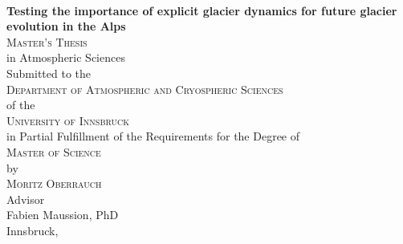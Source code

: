 \begin{titlepage}
\begin{center}

~\\[15mm]
{\Huge  {\bf Testing the importance of explicit glacier dynamics for
future glacier evolution in the Alps}}\\[5mm]




{\Large \textsc{Master's Thesis}} \\[15mm]


{\large in Atmospheric Sciences} \\[15mm]


{\large Submitted to the} \\[2mm]
{\Large \textsc{Department of Atmospheric and Cryospheric Sciences}} \\[2mm]
{\large of the} \\[2mm]
{\Large \textsc{University of Innsbruck}} \\[15mm]


{\large in Partial Fulfillment of the Requirements for the Degree of} \\[2mm]
{\Large \textsc{Master of Science}} \\[15mm]


{\large by} \\[2mm]
{\Large \textsc{Moritz Oberrauch}} \\[15mm]


{\large Advisor} \\[2mm]
{\large Fabien Maussion, PhD} \\[15mm]


{\large Innsbruck, \monthyeardate{\today}}


\end{center}
\end{titlepage}
